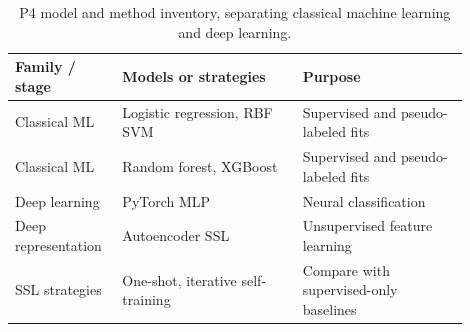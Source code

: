 \begin{table}[!htbp]\centering\footnotesize
\setlength{\tabcolsep}{5pt}
\caption{P4 model and method inventory, separating classical machine learning and deep learning.}\label{tab:p4methods}
\begin{tabular}{@{}p{0.19\linewidth}p{0.37\linewidth}p{0.34\linewidth}@{}}\toprule
\textbf{Family / stage} & \textbf{Models or strategies} & \textbf{Purpose}\\\midrule
\rowcolor{gold!10}
Classical ML & Logistic regression, RBF SVM & Supervised and pseudo-labeled fits\\
\rowcolor{gold!10}
Classical ML & Random forest, XGBoost & Supervised and pseudo-labeled fits\\
\rowcolor{teal!9}
Deep learning & PyTorch MLP & Neural classification\\
\rowcolor{teal!9}
Deep representation & Autoencoder SSL & Unsupervised feature learning\\
\rowcolor{mist}
SSL strategies & One-shot, iterative self-training & Compare with supervised-only baselines\\
\bottomrule\end{tabular}
\end{table}

